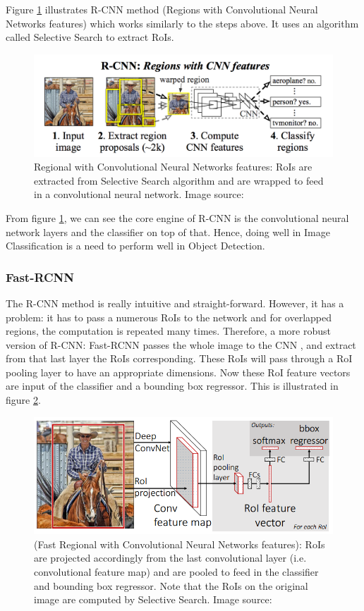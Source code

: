 Figure \ref{fig:rcnn} illustrates R-CNN method (Regions with Convolutional Neural Networks features) \cite{DBLP:journals/corr/GirshickDDM13} which works similarly to the steps above. It uses an algorithm called Selective Search \cite{Uijlings:2013:SSO:2509349.2509382} to extract RoIs.
\begin{figure}[tb]
	\centering
	\includegraphics[width=1.0\hsize]{./figures/rcnn}
	\caption{Regional with Convolutional Neural Networks features: RoIs are extracted from Selective Search algorithm \cite{Uijlings:2013:SSO:2509349.2509382} and are wrapped to feed in a convolutional neural network. Image source: \cite{DBLP:journals/corr/GirshickDDM13}}
	\label{fig:rcnn}
\end{figure}
From figure \ref{fig:rcnn}, we can see the core engine of R-CNN is the convolutional neural network layers and the classifier on top of that. Hence, doing well in Image Classification is a need to perform well in Object Detection.

\subsubsection{Fast-RCNN}
The R-CNN method is really intuitive and straight-forward. However, it has a problem: it has to pass a numerous RoIs to the network and for overlapped regions, the computation is repeated many times. Therefore, a more robust version of R-CNN: Fast-RCNN \cite{DBLP:journals/corr/Girshick15} passes the whole image to the CNN , and extract from that last layer the RoIs corresponding. These RoIs will pass through a RoI pooling layer to have an appropriate dimensions. Now these RoI feature vectors are input of the classifier and a bounding box regressor. This is illustrated in figure \ref{fig:fastRCNN}.
\begin{figure}[tb]
	\centering
	\includegraphics[width=0.9\hsize]{./figures/fastRCNN}
	\caption{ (Fast Regional with Convolutional Neural Networks features): RoIs are projected accordingly from the last convolutional layer (i.e. convolutional feature map) and are pooled to feed in the classifier and bounding box regressor. Note that the RoIs on the original image are computed by Selective Search. Image source: \cite{DBLP:journals/corr/Girshick15}}
	\label{fig:fastRCNN}
\end{figure}


